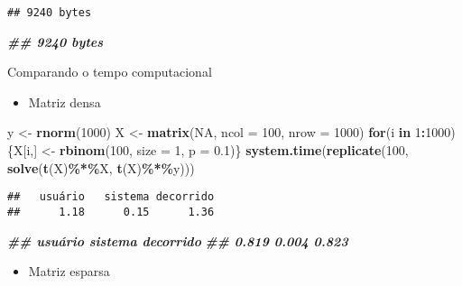 \documentclass[
]{article}
\newenvironment{Shaded}{\begin{snugshade}}{\end{snugshade}}
\newcommand{\AttributeTok}[1]{\textcolor[rgb]{0.13,0.29,0.53}{#1}}
\newcommand{\ConstantTok}[1]{\textcolor[rgb]{0.56,0.35,0.01}{#1}}
\newcommand{\ControlFlowTok}[1]{\textcolor[rgb]{0.13,0.29,0.53}{\textbf{#1}}}
\newcommand{\DecValTok}[1]{\textcolor[rgb]{0.00,0.00,0.81}{#1}}
\newcommand{\DocumentationTok}[1]{\textcolor[rgb]{0.56,0.35,0.01}{\textbf{\textit{#1}}}}
\newcommand{\FloatTok}[1]{\textcolor[rgb]{0.00,0.00,0.81}{#1}}
\newcommand{\FunctionTok}[1]{\textcolor[rgb]{0.13,0.29,0.53}{\textbf{#1}}}
\newcommand{\NormalTok}[1]{#1}
\newcommand{\OtherTok}[1]{\textcolor[rgb]{0.56,0.35,0.01}{#1}}
\newcommand{\SpecialCharTok}[1]{\textcolor[rgb]{0.81,0.36,0.00}{\textbf{#1}}}
\providecommand{\tightlist}{%
  \setlength{\itemsep}{0pt}\setlength{\parskip}{0pt}}
\begin{document}
\begin{verbatim}
## 9240 bytes
\end{verbatim}

\begin{Shaded}
\begin{Highlighting}[]
\DocumentationTok{\#\# 9240 bytes}
\end{Highlighting}
\end{Shaded}

Comparando o tempo computacional

\begin{itemize}
\tightlist
\item
  Matriz densa
\end{itemize}

\begin{Shaded}
\begin{Highlighting}[]
\NormalTok{y }\OtherTok{\textless{}{-}} \FunctionTok{rnorm}\NormalTok{(}\DecValTok{1000}\NormalTok{)}
\NormalTok{X }\OtherTok{\textless{}{-}} \FunctionTok{matrix}\NormalTok{(}\ConstantTok{NA}\NormalTok{, }\AttributeTok{ncol =} \DecValTok{100}\NormalTok{, }\AttributeTok{nrow =} \DecValTok{1000}\NormalTok{)}
\ControlFlowTok{for}\NormalTok{(i }\ControlFlowTok{in} \DecValTok{1}\SpecialCharTok{:}\DecValTok{1000}\NormalTok{) \{X[i,] }\OtherTok{\textless{}{-}} \FunctionTok{rbinom}\NormalTok{(}\DecValTok{100}\NormalTok{, }\AttributeTok{size =} \DecValTok{1}\NormalTok{, }\AttributeTok{p =} \FloatTok{0.1}\NormalTok{)\}}
\FunctionTok{system.time}\NormalTok{(}\FunctionTok{replicate}\NormalTok{(}\DecValTok{100}\NormalTok{, }\FunctionTok{solve}\NormalTok{(}\FunctionTok{t}\NormalTok{(X)}\SpecialCharTok{\%*\%}\NormalTok{X, }\FunctionTok{t}\NormalTok{(X)}\SpecialCharTok{\%*\%}\NormalTok{y)))}
\end{Highlighting}
\end{Shaded}

\begin{verbatim}
##   usuário   sistema decorrido 
##      1.18      0.15      1.36
\end{verbatim}

\begin{Shaded}
\begin{Highlighting}[]
\DocumentationTok{\#\# usuário sistema decorrido}
\DocumentationTok{\#\# 0.819 0.004 0.823}
\end{Highlighting}
\end{Shaded}

\begin{itemize}
\tightlist
\item
  Matriz esparsa
\end{itemize}
\end{document}
